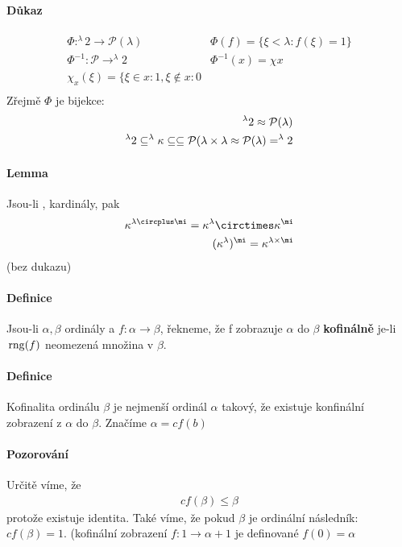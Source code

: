 \documentclass[a4paper,12pt,titlepage]{article}
\begin{document}
\begin{enumerate}
\paragraph{Důkaz}
\begin{align}
	\Phi: ^\lambda 2 \to \mathcal{P}(\lambda)  & \Phi(f) = \{ \xi < \lambda :
	f(\xi) = 1 \}\\
	\Phi^{-1}  : \mathcal{P} \to ^\lambda 2 & \Phi^{-1}  ( x) = \chi x \quad \\
	\chi_x(\xi) = \{ \xi \in x: 1, \xi \nin x: 0 \\
\end{align}
Zřejmě $\Phi$ je bijekce:
\begin{align}
	^\lambda 2 \approx \mathcal{P}(\lambda) \\
	^\lambda 2 \subseteq ^\lambda \kappa \subseteq \subseteq \mathcal{P}(\lambda
	\times \lambda \approx \mathcal{P} (\lambda) = ^\lambda 2
\end{align}

\paragraph{Lemma}
Jsou-li \kappa, \lambda kardinály, pak 
\begin{align}
	\kappa^{\lambda \circplus \mi} = \kappa^\lambda \circtimes \kappa^\mi \\
	(\kappa^\lambda)^\mi = \kappa^{\lambda \times \mi} 
\end{align}
(bez dukazu)

\paragraph{Definice}
Jsou-li $\alpha, \beta$ ordinály a $f: \alpha \to \beta$, řekneme, že f
zobrazuje $\alpha$ do $\beta$ \textbf{kofinálně} je-li $\operatorname*{\,rng}(f)$ neomezená
množina v $\beta$.
\paragraph{Definice}
Kofinalita ordinálu $\beta$ je nejmenší ordinál $\alpha$ takový, že existuje
konfinální zobrazení z $\alpha$ do $\beta$. Značíme $\alpha = cf(b)$
\paragraph{Pozorování}
Určitě víme, že 
\begin{align}
	cf(\beta) \le \beta
\end{align}
protože existuje identita. Také víme, že pokud $\beta$ je ordinální následník:
$cf(\beta) = 1$. (kofinální zobrazení $f: 1 \to \alpha + 1$ je definované $f(0) =
\alpha$


\end{enumerate}
\end{document}
